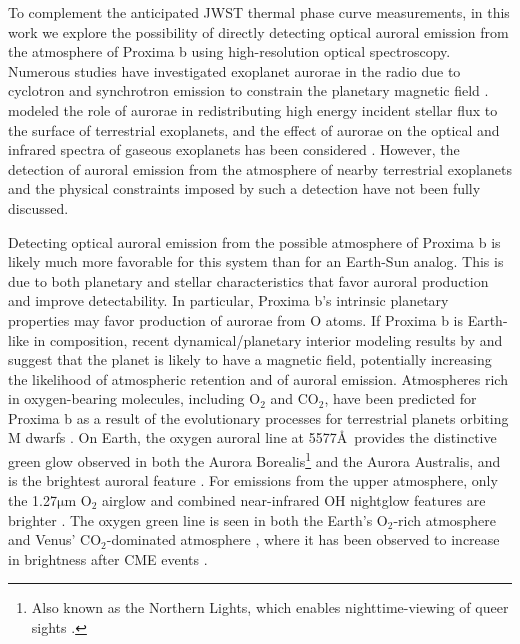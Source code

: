 \documentclass[apjl]{emulateapj}
\begin{document}
To complement the anticipated JWST thermal phase curve measurements, in this work we explore the possibility of directly detecting optical auroral emission from the atmosphere of Proxima b using high-resolution optical spectroscopy. Numerous studies have investigated exoplanet aurorae in the radio due to cyclotron and synchrotron emission to constrain the planetary magnetic field \citep[e.g.][]{Bastian2000,Grie2007,Zarka2007,Hess2011,Driscoll2011}. \citet{Smith2004} modeled the role of aurorae in redistributing high energy incident stellar flux to the surface of terrestrial exoplanets, and the effect of aurorae on the optical and infrared spectra of gaseous exoplanets has been considered \citep{Rimmer2015}. However, the detection of auroral emission from the atmosphere of nearby terrestrial exoplanets and the physical constraints imposed by such a detection have not been fully discussed. 

Detecting optical auroral emission from the possible atmosphere of Proxima b is likely much more favorable for this system than for an Earth-Sun analog. This is due to both planetary and stellar characteristics that favor auroral production and improve detectability. In particular, Proxima b's intrinsic planetary properties may favor production of aurorae from O atoms. If Proxima b is Earth-like in composition, recent dynamical/planetary interior modeling results by \citet{Barnes2016} and \citet{Zuluaga2016} suggest that the planet is likely to have a magnetic field, potentially increasing the likelihood of atmospheric retention and of auroral emission. Atmospheres rich in oxygen-bearing molecules, including O$_2$ and CO$_2$, have been predicted for Proxima b \citep{Meadows2016} as a result of the evolutionary processes for terrestrial planets orbiting M dwarfs \citep{LugerBarnes2015,Barnes2016}. On Earth, the oxygen auroral line at 5577\AA\ provides the distinctive green glow observed in both the Aurora Borealis\footnote{Also known as the Northern Lights, which enables nighttime-viewing of queer sights \citep{Service1907}.} and the Aurora Australis, and is the brightest auroral feature \citep{Chamberlain1961, Dempsey2005}. For emissions from the upper atmosphere, only the 1.27$\mathrm{\mu}$m O$_2$ airglow and combined near-infrared OH nightglow features are brighter \citep{Hunten1967}. The oxygen green line is seen in both the Earth's O$_2$-rich atmosphere \citep{Chamberlain1961} and Venus' CO$_2$-dominated atmosphere \citep{Slanger2001}, where it has been observed to increase in brightness after CME events \citep{Gray2014}.
\end{document}
